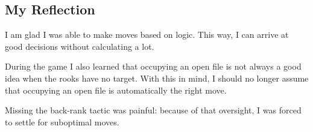 \subsection*{My Reflection}
I am glad I was able to make moves based on logic. This way, I can arrive at
good decisions without calculating a lot.

During the game I also learned that occupying an open file is not always a good idea
when the rooks have no target. With this in mind, I should no longer assume that
occupying an open file is automatically the right move.

Missing the back-rank tactic was painful: because of that oversight, I was forced
to settle for suboptimal moves.